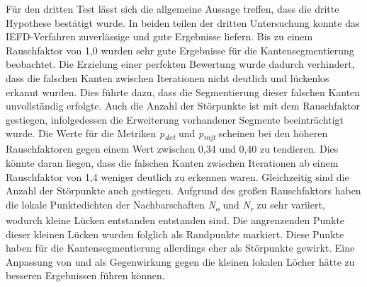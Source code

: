 Für den dritten Test lässt sich die allgemeine Aussage treffen, dass die dritte Hypothese bestätigt wurde. In beiden teilen der dritten Untersuchung konnte das IEFD-Verfahren zuverlässige und gute Ergebnisse liefern. Bis zu einem Rauschfaktor von 1,0 wurden sehr gute Ergebnisse für die Kantensegmentierung beobachtet. Die Erzielung einer perfekten Bewertung wurde dadurch verhindert, dass die falschen Kanten zwischen Iterationen nicht deutlich und lückenlos erkannt wurden. Dies führte dazu, dass die Segmentierung dieser falschen Kanten unvollständig erfolgte. Auch die Anzahl der Störpunkte ist mit dem Rauschfaktor gestiegen, infolgedessen die Erweiterung vorhandener Segmente beeinträchtigt wurde. Die Werte für die Metriken \textit{p\textsubscript{dct}} und \textit{p\textsubscript{mjt}} scheinen bei den höheren Rauschfaktoren gegen einem Wert zwischen 0,34 und 0,40 zu tendieren. Dies könnte daran liegen, dass die falschen Kanten zwischen Iterationen ab einem Rauschfaktor von 1,4 weniger deutlich zu erkennen waren. Gleichzeitig sind die Anzahl der Störpunkte auch gestiegen. Aufgrund des großen Rauschfaktors haben die lokale Punktedichten der Nachbarschaften \textit{N\textsubscript{o}} und \textit{N\textsubscript{r}} zu sehr variiert, wodurch kleine Lücken entstanden entstanden sind. Die angrenzenden Punkte dieser kleinen Lücken wurden folglich als Randpunkte markiert. Diese Punkte haben für die Kantensegmentierung allerdings eher als Störpunkte gewirkt. Eine Anpassung von \distthresha und \distthreshb als Gegenwirkung gegen die kleinen lokalen Löcher hätte zu besseren Ergebnissen führen können. 

